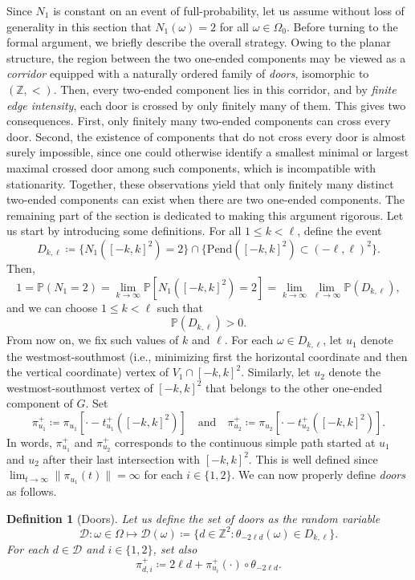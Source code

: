 \documentclass[a4paper, 11pt]{article} %
\theoremstyle{plain}
\newtheorem{definition}[theorem]{Definition}
\newcommand{\backward}{\mathrm{Pend}}
\newcommand{\D}{\mathcal D}
\newcommand{\Z}{\mathbb{Z}}
\newcommand{\1}{\mathds 1}
\renewcommand{\P}{\mathbb{P}}
\numberwithin{equation}{section}
\begin{document}
Since $N_1$ is constant on an event of full-probability, let us assume without loss of generality in this section that $N_1(\omega)=2$ for all $\omega\in\Omega_0$. Before turning to the formal argument, we briefly describe the overall strategy. Owing to the planar structure, the region between the two one-ended components may be viewed as a \emph{corridor} equipped with a naturally ordered family of \emph{doors}, isomorphic to $(\Z,<)$. Then, every two-ended component lies in this corridor, and by \emph{finite edge intensity}, each door is crossed by only finitely many of them. This gives two consequences. First, only finitely many two-ended components can cross every door. Second, the existence of components that do not cross every door is almost surely impossible, since one could otherwise identify a smallest minimal or largest maximal crossed door among such components, which is incompatible with stationarity. Together, these observations yield that only finitely many distinct two-ended components can exist when there are two one-ended components. The remaining part of the section is dedicated to making this argument rigorous. Let us start by introducing some definitions. For all $1\leq k<\ell$, define the event
    \[D_{k,\ell}\coloneqq \{N_1([-k,k]^2)=2\}\cap\{\backward([-k,k]^2)\subset(-\ell,\ell)^2\}.\]
Then,
    \[1=\P(N_1=2)=\lim_{k\to\infty}\P[N_1([-k,k]^2)=2]=\lim_{k\to\infty}\lim_{\ell\to\infty}\P(D_{k,\ell}),\]
and we can choose $1\leq k<\ell$ such that
    \[\P(D_{k,\ell})>0.\]
From now on, we fix such values of $k$ and $\ell$. For each $\omega\in D_{k,\ell}$, let $u_1$ denote the westmost-southmost (i.e., minimizing first the horizontal coordinate and then the vertical coordinate) vertex of $V_1\cap [-k,k]^2$. Similarly, let $u_2$ denote the westmost-southmost vertex of $[-k,k]^2$ that belongs to the other one-ended component of $G$. Set
    \[\pi_{u_1}^+\coloneqq\pi_{u_1}[\cdot-t^+_{u_1}([-k, k]^2)]\quad\text{and}\quad\pi_{u_2}^+\coloneqq\pi_{u_2}[\cdot-t^+_{u_2}([-k, k]^2)].\]
In words, $\pi_{u_1}^+$ and $\pi_{u_2}^+$ corresponds to the continuous simple path started at $u_1$ and $u_2$ after their last intersection with $[-k,k]^2$. This is well defined since $\lim_{t\to\infty}\|\pi_{u_1}(t)\|=\infty$ for each $i\in\{1,2\}$. We can now properly define \emph{doors} as follows.


\begin{definition}[Doors]
    Let us define the set of \emph{doors} as the random variable
        \[\D:\omega\in\Omega\mapsto\D(\omega)\coloneqq\{d\in\Z^2:\theta_{-2\ell d}(\omega)\in D_{k,\ell}\}.\]
    For each $d\in\D$ and $i\in\{1,2\}$, set also 
        \[\pi_{d, i}^+\coloneqq 2\ell d+\pi_{u_i}^+(\cdot)\circ\theta_{-2\ell d}.\]
\end{definition}
\end{document}

